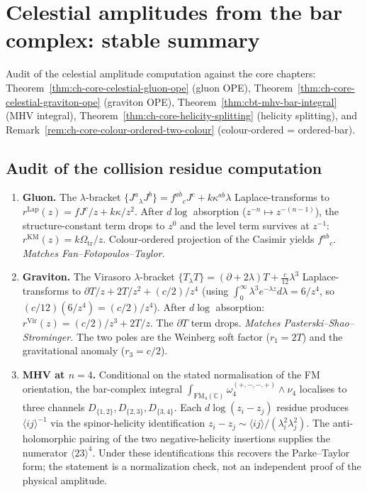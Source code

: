 \documentclass[11pt]{article}
\newcommand{\C}{\mathbb{C}}
\begin{document}

\section{Celestial amplitudes from the bar complex: stable summary}
\label{sec:celestial-bar-stable}

Audit of the celestial amplitude computation against the core
chapters: Theorem~\ref{thm:ch-core-celestial-gluon-ope}
(gluon OPE), Theorem~\ref{thm:ch-core-celestial-graviton-ope} (graviton
OPE), Theorem~\ref{thm:cbt-mhv-bar-integral} (MHV integral),
Theorem~\ref{thm:ch-core-helicity-splitting} (helicity splitting), and
Remark~\ref{rem:ch-core-colour-ordered-two-colour} (colour-ordered =
ordered-bar).

\subsection*{Audit of the collision residue computation}

\begin{enumerate}[label=(\roman*),nosep]
\item \textbf{Gluon.}  The $\lambda$-bracket $\{J^a{}_\lambda J^b\} =
  f^{ab}{}_c J^c + k\kappa^{ab}\lambda$ Laplace-transforms to
  $r^{\mathrm{Lap}}(z) = fJ^c/z + k\kappa/z^2$.  After $d\log$
  absorption ($z^{-n}\mapsto z^{-(n-1)}$), the structure-constant
  term drops to $z^0$ and the level term survives at $z^{-1}$:
  $r^{\mathrm{KM}}(z) = k\Omega_{\mathrm{tr}}/z$.  Colour-ordered projection of the
  Casimir yields $f^{ab}{}_c$.  \emph{Matches Fan--Fotopoulos--Taylor.}

\item \textbf{Graviton.}  The Virasoro $\lambda$-bracket
  $\{T{}_\lambda T\} = (\partial + 2\lambda)T + \frac{c}{12}\lambda^3$
  Laplace-transforms to $\partial T/z + 2T/z^2 + (c/2)/z^4$ (using
  $\int_0^\infty \lambda^3 e^{-\lambda z}d\lambda = 6/z^4$, so
  $(c/12)(6/z^4) = (c/2)/z^4$).  After $d\log$ absorption:
  $r^{\mathrm{Vir}}(z) = (c/2)/z^3 + 2T/z$.  The $\partial T$ term
  drops.  \emph{Matches Pasterski--Shao--Strominger.}  The two poles
  are the Weinberg soft factor ($r_1 = 2T$) and the gravitational
  anomaly ($r_3 = c/2$).

\item \textbf{MHV at $n=4$.}  Conditional on the stated
  normalisation of the FM orientation, the bar-complex integral
  $\int_{\overline{\mathrm{FM}}_4(\C)} \omega_4^{(+,-,-,+)} \wedge \nu_4$
  localises to three channels $D_{\{1,2\}}, D_{\{2,3\}}, D_{\{3,4\}}$.
  Each $d\log(z_i - z_j)$ residue produces $\langle ij\rangle^{-1}$ via
  the spinor-helicity identification $z_i - z_j \sim \langle ij\rangle /
  (\lambda_i^2\lambda_j^2)$.  The anti-holomorphic pairing of the two
  negative-helicity insertions supplies the numerator
  $\langle 23\rangle^4$.  Under these identifications this
  recovers the Parke--Taylor form; the statement is a
  normalization check, not an independent proof of the physical
  amplitude.
\end{enumerate}
\end{document}
